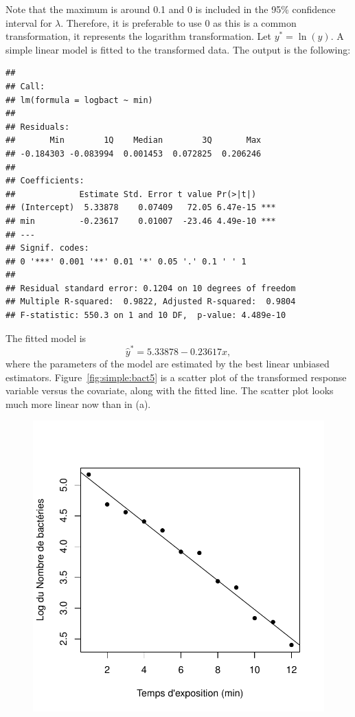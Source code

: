\begin{solution}{2.22}
\begin{enumerate}
Note that the maximum is around 0.1 and 0 is included in the 95\% confidence interval for $\lambda$. Therefore, it is preferable to use 0 as this is a common transformation, it represents the logarithm transformation. Let $y^{*}=\ln(y)$. A simple linear model is fitted to the transformed data. The output is the following:
\begin{knitrout}
\color{fgcolor}\begin{kframe}
\begin{alltt}
 \hlkwb{<-} 
 \hlkwb{<-} \hlopt{~}
\end{alltt}
\begin{verbatim}
##
## Call:
## lm(formula = logbact ~ min)
##
## Residuals:
##       Min        1Q    Median        3Q       Max
## -0.184303 -0.083994  0.001453  0.072825  0.206246
##
## Coefficients:
##             Estimate Std. Error t value Pr(>|t|)
## (Intercept)  5.33878    0.07409   72.05 6.47e-15 ***
## min         -0.23617    0.01007  -23.46 4.49e-10 ***
## ---
## Signif. codes:
## 0 '***' 0.001 '**' 0.01 '*' 0.05 '.' 0.1 ' ' 1
##
## Residual standard error: 0.1204 on 10 degrees of freedom
## Multiple R-squared:  0.9822,	Adjusted R-squared:  0.9804
## F-statistic: 550.3 on 1 and 10 DF,  p-value: 4.489e-10
\end{verbatim}
\end{kframe}
\end{knitrout}

The fitted model is $$\hat{y}^{*}=5.33878-0.23617x,$$ where the parameters of the model are estimated by the best linear unbiased estimators. Figure~\ref{fig:simple:bact5} is a scatter plot of the transformed response variable versus the covariate, along with the fitted line. The scatter plot looks much more linear now than in (a).

\begin{figure}
\begin{knitrout}
\color{fgcolor}

{\centering \includegraphics[width=.45\linewidth]{figure/fig-simple-bact5-1}

}
\end{knitrout}
\end{figure}
\end{enumerate}
\end{solution}
